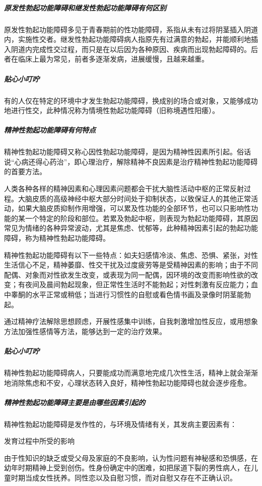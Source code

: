\subparagraph{原发性勃起功能障碍和继发性勃起功能障碍有何区别}

原发性勃起功能障碍多见于青春期前的性功能障碍，系指从未有过将阴茎插入阴道内，实施性交者。继发性勃起功能障碍病人指原先有过满意的勃起，并能顺利地插入阴道内完成性交过程，而只是在以后因为各种原因、疾病而出现勃起障碍的。后者在临床上最为常见，前者多逐渐发病，进展缓慢，且越来越重。

\subparagraph{贴心小叮咛}

有的人仅在特定的环境中才发生勃起功能障碍，换成别的场合或对象，又能够成功地进行性交，此种情况称为情境性勃起功能障碍（旧称境遇性阳痿）。

\subparagraph{精神性勃起功能障碍有何特点}

精神性勃起功能障碍又称心因性勃起功能障碍，是因为精神性因素所引起。俗话说“心病还得心药治”，即心理治疗，解除精神不良因素是治疗精神性勃起功能障碍的首要方法。

人类各种各样的精神因素和心理因素问题都会干扰大脑性活动中枢的正常反射过程。大脑皮质的高级神经中枢大部分时间处于抑制状态，以致保证人的其他正常活动，如果大脑皮质抑制作用增强，可以累及性功能的全部环节，也可以只影响性功能的某一个特定的阶段和部位。若累及勃起中枢，则表现为勃起功能障碍，其原因常见为情绪的各种异常波动，尤其是焦虑、忧郁等，此种精神因素引起的勃起功能障碍，称为精神性勃起功能障碍。

精神性勃起功能障碍有以下一些特点：如夫妇感情冷淡、焦虑、恐惧、紧张，对性生活信心不足，精神萎靡、性交干扰及过度疲劳等是受精神因素的影响；由于不同配偶、对象而对性欲发生改变，或表现为同一配偶，因环境的改变而影响性欲的改变；有夜间及晨间勃起现象，但正常性生活时不能勃起；对性刺激有反应能力；血中睾酮的水平正常或稍低；当进行习惯性的自慰或看色情书画及录像时阴茎能勃起。

通过精神疗法解除思想顾虑，开展性感集中训练，自我刺激增加性反应，或用想象方法加强性感情等方法，能够达到一定的治疗效果。

\subparagraph{贴心小叮咛}

精神性勃起功能障碍病人，只要能成功而满意地完成几次性生活，精神上就会渐渐地消除焦虑和不安，心理状态转入良好，精神性勃起功能障碍也就会逐步痊愈。

\subparagraph{精神性勃起功能障碍主要是由哪些因素引起的}

精神性勃起功能障碍是发作性的，与环境及情绪有关，其发病主要因素有：

发育过程中所受的影响

由于性知识的缺乏或受父母及家庭的不良影响，认为性问题有神秘感和恐惧感，在幼年时期精神上受到创伤。性身份确定中的困难，如把尿道下裂的男性病人，在儿童时期当成女性抚养。同性恋以及自慰习惯，而对自慰又存在不正确认识。

